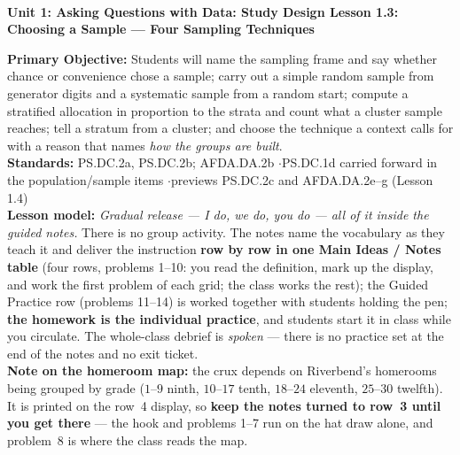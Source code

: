 \documentclass[10pt]{article}
\newcommand{\UnitNumberName}{Unit 1: Asking Questions with Data: Study Design \quad}
\newcommand{\LessonNumberName}{Lesson 1.3: Choosing a Sample --- Four Sampling Techniques}
\begin{document}
\begin{center}
    {\Large\bfseries \CourseName \\
    {\small\bfseries \UnitNumberName \LessonNumberName}}
\end{center}

\begin{tcolorbox}[colback=frost, colframe=cerulean, boxrule=0.9pt, arc=2mm,
    left=2mm, right=2mm, top=1.5mm, bottom=1.5mm]
    \textbf{Primary Objective:} Students will name the sampling frame and say whether chance
    or convenience chose a sample; carry out a simple random sample from generator digits and
    a systematic sample from a random start; compute a stratified allocation in proportion to
    the strata and count what a cluster sample reaches; tell a stratum from a cluster; and
    choose the technique a context calls for with a reason that names \emph{how the groups are
    built}.
    \\[2pt]
    \textbf{Standards:} PS.DC.2a, PS.DC.2b; AFDA.DA.2b \quad$\cdot$\quad PS.DC.1d carried
    forward in the population/sample items \quad$\cdot$\quad previews PS.DC.2c and
    AFDA.DA.2e--g (Lesson 1.4)
    \\[2pt]
    \textbf{Lesson model:} \emph{Gradual release --- I do, we do, you do --- all of it inside
    the guided notes.} There is no group activity. The notes name the vocabulary as they teach
    it and deliver the instruction \textbf{row by row in one Main Ideas / Notes table} (four
    rows, problems 1--10: you read the definition, mark up the display, and work the first
    problem of each grid; the class works the rest); the Guided Practice row (problems 11--14)
    is worked together with students holding the pen; \textbf{the homework is the individual practice}, and students
    start it in class while you circulate. The whole-class debrief is \emph{spoken} --- there is
    no practice set at the end of the notes and no exit ticket.
    \\[2pt]
    \textbf{Note on the homeroom map:} the crux depends on Riverbend's homerooms being grouped
    by grade ($1$--$9$ ninth, $10$--$17$ tenth, $18$--$24$ eleventh, $25$--$30$ twelfth). It is
    printed on the row~4 display, so \textbf{keep the notes turned to row~3 until you get
    there} --- the hook and problems 1--7 run on the hat draw alone, and problem~8 is where
    the class reads the map.
\end{tcolorbox}
\end{document}
